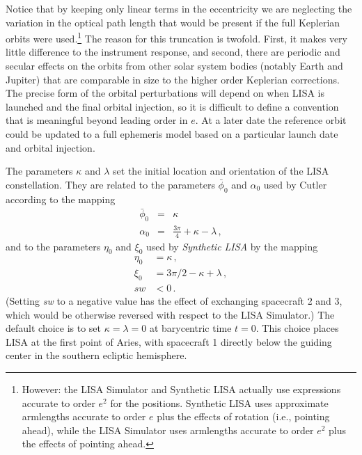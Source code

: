 \documentclass[11pt]{report}
\begin{document}
Notice that by keeping only linear terms in the eccentricity we are neglecting the
variation in the optical path length that would be present if the full Keplerian
orbits were used.\footnote{However: the LISA Simulator and Synthetic LISA actually use expressions
accurate to order $e^2$ for the positions. Synthetic LISA uses approximate armlengths
accurate to order $e$ plus the effects of rotation (i.e., pointing ahead), while the LISA Simulator
uses armlengths accurate to order $e^2$
plus the effects of pointing ahead.} The reason for this truncation is twofold. First,
it makes very little difference to the instrument response, and second, there are
periodic and secular effects on the orbits from other solar system bodies (notably
Earth and Jupiter) that are comparable in size to the higher order Keplerian corrections.
The precise form of the orbital perturbations will depend on when LISA is launched
and the final orbital injection, so it is difficult to define a convention that is
meaningful beyond leading order in $e$. At a later date the reference orbit could be
updated to a full ephemeris model based on a particular launch date and orbital
injection.

The parameters $\kappa$ and $\lambda$ set the initial location and orientation of the
LISA constellation. They are related to the parameters $\bar{\phi}_0$ and $\alpha_0$
used by Cutler~\cite{cutler98} according to the mapping
%
\begin{eqnarray}
\bar{\phi}_0 &=& \kappa \nonumber \\
\alpha_0 & = & \frac{3 \pi}{4} + \kappa -\lambda \, ,
\end{eqnarray}
%
and to the parameters $\eta_0$ and $\xi_0$ used by \emph{Synthetic LISA} \cite{synthlisa,vallis2005}
by the mapping
%
\begin{equation}
\begin{aligned}
\eta_0 &= \kappa \,,  \nonumber \\
\xi_0 &= 3 \pi / 2 - \kappa + \lambda \,, \\
\mathit{sw} &< 0 \, .
\end{aligned}
\end{equation}
%
(Setting \textit{sw} to a negative value has the effect of exchanging spacecraft 2 and 3, which
would be otherwise reversed with respect to the LISA Simulator.)
The default choice is to set $\kappa=\lambda=0$ at barycentric time $t=0$. This choice places LISA at the
first point of Aries, with spacecraft 1 directly below the guiding center in the southern
ecliptic hemisphere.
\end{document}
